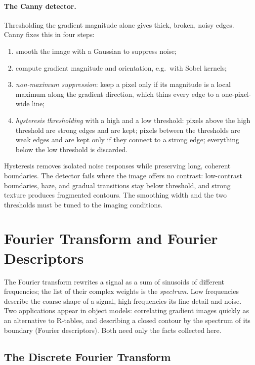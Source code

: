 \paragraph{The Canny detector.}
Thresholding the gradient magnitude alone gives thick, broken, noisy edges.
Canny fixes this in four steps:
\begin{enumerate}
  \item smooth the image with a Gaussian to suppress noise;
  \item compute gradient magnitude and orientation, e.g.\ with Sobel kernels;
  \item \emph{non-maximum suppression}: keep a pixel only if its magnitude is a
        local maximum along the gradient direction, which thins every edge to a
        one-pixel-wide line;
  \item \emph{hysteresis thresholding} with a high and a low threshold: pixels
        above the high threshold are strong edges and are kept; pixels between
        the thresholds are weak edges and are kept only if they connect to a
        strong edge; everything below the low threshold is discarded.
\end{enumerate}
\noindent
Hysteresis removes isolated noise responses while preserving long, coherent
boundaries. The detector fails where the image offers no contrast: low-contrast
boundaries, haze, and gradual transitions stay below threshold, and strong
texture produces fragmented contours. The smoothing width and the two thresholds
must be tuned to the imaging conditions.

\section{Fourier Transform and Fourier Descriptors}
\label{app:fourier}

The Fourier transform rewrites a signal as a sum of sinusoids of different
frequencies; the list of their complex weights is the \emph{spectrum}. Low
frequencies describe the coarse shape of a signal, high frequencies its fine
detail and noise. Two applications appear in object models: correlating
gradient images quickly as an alternative to R-tables, and describing a closed
contour by the spectrum of its boundary (Fourier descriptors). Both need only the
facts collected here.

\subsection{The Discrete Fourier Transform}

